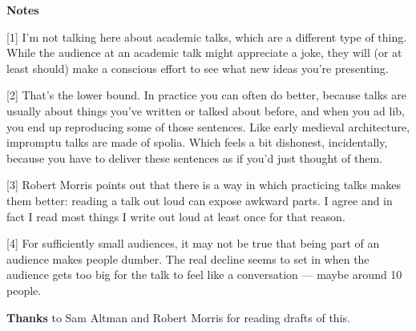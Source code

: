 \textbf{Notes}

{[}1{]} I'm not talking here about academic talks, which are a different
type of thing. While the audience at an academic talk might appreciate a
joke, they will (or at least should) make a conscious effort to see what
new ideas you're presenting.

{[}2{]} That's the lower bound. In practice you can often do better,
because talks are usually about things you've written or talked about
before, and when you ad lib, you end up reproducing some of those
sentences. Like early medieval architecture, impromptu talks are made of
spolia. Which feels a bit dishonest, incidentally, because you have to
deliver these sentences as if you'd just thought of them.

{[}3{]} Robert Morris points out that there is a way in which practicing
talks makes them better: reading a talk out loud can expose awkward
parts. I agree and in fact I read most things I write out loud at least
once for that reason.

{[}4{]} For sufficiently small audiences, it may not be true that being
part of an audience makes people dumber. The real decline seems to set
in when the audience gets too big for the talk to feel like a
conversation --- maybe around 10 people.

\textbf{Thanks} to Sam Altman and Robert Morris for reading drafts of
this.
